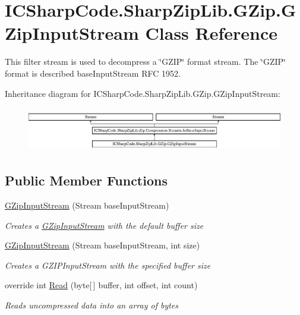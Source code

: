 \hypertarget{class_i_c_sharp_code_1_1_sharp_zip_lib_1_1_g_zip_1_1_g_zip_input_stream}{}\section{I\+C\+Sharp\+Code.\+Sharp\+Zip\+Lib.\+G\+Zip.\+G\+Zip\+Input\+Stream Class Reference}
\label{class_i_c_sharp_code_1_1_sharp_zip_lib_1_1_g_zip_1_1_g_zip_input_stream}


This filter stream is used to decompress a \char`\"{}\+G\+Z\+I\+P\char`\"{} format stream. The \char`\"{}\+G\+Z\+I\+P\char`\"{} format is described base\+Input\+Stream R\+FC 1952.  


Inheritance diagram for I\+C\+Sharp\+Code.\+Sharp\+Zip\+Lib.\+G\+Zip.\+G\+Zip\+Input\+Stream\+:\begin{figure}[H]
\begin{center}
\leavevmode
\includegraphics[height=1.962617cm]{class_i_c_sharp_code_1_1_sharp_zip_lib_1_1_g_zip_1_1_g_zip_input_stream}
\end{center}
\end{figure}
\subsection*{Public Member Functions}
\begin{DoxyCompactItemize}
\item 
\hyperlink{class_i_c_sharp_code_1_1_sharp_zip_lib_1_1_g_zip_1_1_g_zip_input_stream_a1b9e192df6366d0e8c5328037634393c}{G\+Zip\+Input\+Stream} (Stream base\+Input\+Stream)
\begin{DoxyCompactList}\small\item\em Creates a \hyperlink{class_i_c_sharp_code_1_1_sharp_zip_lib_1_1_g_zip_1_1_g_zip_input_stream}{G\+Zip\+Input\+Stream} with the default buffer size \end{DoxyCompactList}\item 
\hyperlink{class_i_c_sharp_code_1_1_sharp_zip_lib_1_1_g_zip_1_1_g_zip_input_stream_a24156e3136f37c683341fede4a063300}{G\+Zip\+Input\+Stream} (Stream base\+Input\+Stream, int size)
\begin{DoxyCompactList}\small\item\em Creates a G\+Z\+I\+P\+Input\+Stream with the specified buffer size \end{DoxyCompactList}\item 
override int \hyperlink{class_i_c_sharp_code_1_1_sharp_zip_lib_1_1_g_zip_1_1_g_zip_input_stream_a40e8589437e1082b5077afc7d749f78a}{Read} (byte\mbox{[}$\,$\mbox{]} buffer, int offset, int count)
\begin{DoxyCompactList}\small\item\em Reads uncompressed data into an array of bytes \end{DoxyCompactList}\end{DoxyCompactItemize}
